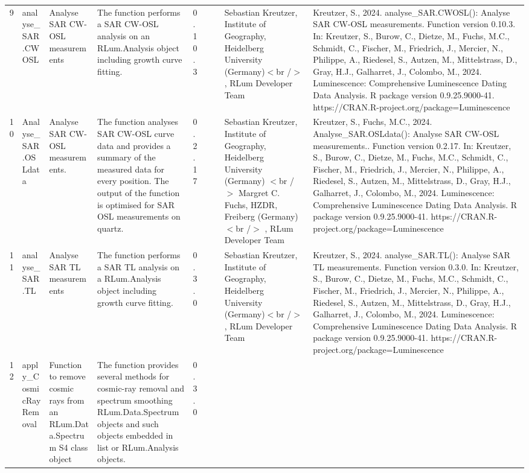\begin{table}[ht]
\begin{tabular}{rllllllll}
  9 & analyse\_SAR.CWOSL & Analyse SAR CW-OSL measurements & The function performs a SAR CW-OSL analysis on an RLum.Analysis  object including growth curve fitting. & 0.10.3
 &  &  & Sebastian Kreutzer, Institute of Geography, Heidelberg University (Germany)$<$br /$>$ , RLum Developer Team & Kreutzer, S., 2024. analyse\_SAR.CWOSL(): Analyse SAR CW-OSL measurements. Function version 0.10.3. In: Kreutzer, S., Burow, C., Dietze, M., Fuchs, M.C., Schmidt, C., Fischer, M., Friedrich, J., Mercier, N., Philippe, A., Riedesel, S., Autzen, M., Mittelstrass, D., Gray, H.J., Galharret, J., Colombo, M., 2024. Luminescence: Comprehensive Luminescence Dating Data Analysis. R package version 0.9.25.9000-41. https://CRAN.R-project.org/package=Luminescence
 \\ 
  10 & Analyse\_SAR.OSLdata & Analyse SAR CW-OSL measurements. & The function analyses SAR CW-OSL curve data and provides a summary of the measured data for every position. The output of the function is optimised for SAR OSL measurements on quartz. & 0.2.17
 &  &  & Sebastian Kreutzer, Institute of Geography, Heidelberg University (Germany) $<$br /$>$ Margret C. Fuchs, HZDR, Freiberg (Germany)$<$br /$>$ , RLum Developer Team & Kreutzer, S., Fuchs, M.C., 2024. Analyse\_SAR.OSLdata(): Analyse SAR CW-OSL measurements.. Function version 0.2.17. In: Kreutzer, S., Burow, C., Dietze, M., Fuchs, M.C., Schmidt, C., Fischer, M., Friedrich, J., Mercier, N., Philippe, A., Riedesel, S., Autzen, M., Mittelstrass, D., Gray, H.J., Galharret, J., Colombo, M., 2024. Luminescence: Comprehensive Luminescence Dating Data Analysis. R package version 0.9.25.9000-41. https://CRAN.R-project.org/package=Luminescence
 \\ 
  11 & analyse\_SAR.TL & Analyse SAR TL measurements & The function performs a SAR TL analysis on a RLum.Analysis  object including growth curve fitting. & 0.3.0
 &  &  & Sebastian Kreutzer, Institute of Geography, Heidelberg University (Germany)$<$br /$>$ , RLum Developer Team & Kreutzer, S., 2024. analyse\_SAR.TL(): Analyse SAR TL measurements. Function version 0.3.0. In: Kreutzer, S., Burow, C., Dietze, M., Fuchs, M.C., Schmidt, C., Fischer, M., Friedrich, J., Mercier, N., Philippe, A., Riedesel, S., Autzen, M., Mittelstrass, D., Gray, H.J., Galharret, J., Colombo, M., 2024. Luminescence: Comprehensive Luminescence Dating Data Analysis. R package version 0.9.25.9000-41. https://CRAN.R-project.org/package=Luminescence
 \\ 
  12 & apply\_CosmicRayRemoval & Function to remove cosmic rays from an RLum.Data.Spectrum S4 class object & The function provides several methods for cosmic-ray removal and spectrum smoothing  RLum.Data.Spectrum  objects and such objects embedded in  list  or RLum.Analysis  objects. & 0.3.0

\end{tabular}
\end{table}
